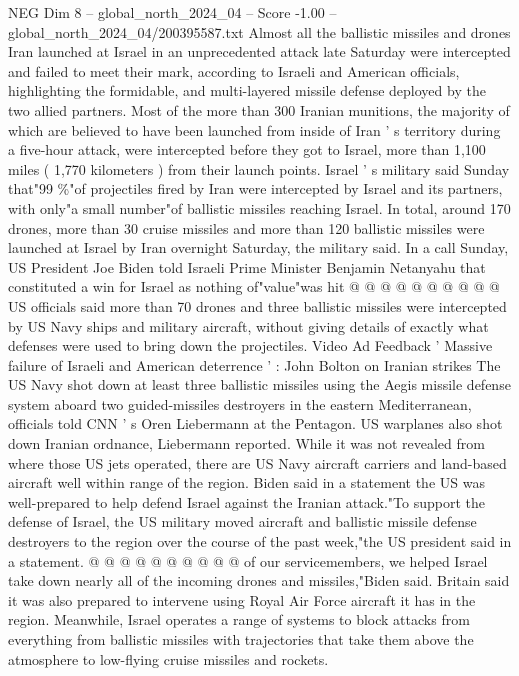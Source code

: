\begin{textsample}{NEG Dim 8 – global\_north\_2024\_04 – Score -1.00 – global\_north\_2024\_04/200395587.txt}  \label{ex:f8_neg_137}
Almost all the ballistic missiles and drones Iran launched at Israel in an unprecedented attack late Saturday were intercepted and failed to meet their mark, according to Israeli and American officials, highlighting the formidable, and multi-layered missile defense deployed by the two allied partners.
Most of the more than 300 Iranian munitions, the majority of which are believed to have been launched from inside of Iran ' s territory during a five-hour attack, were intercepted before they got to Israel, more than 1,100 miles ( 1,770 kilometers ) from their launch points.
Israel ' s military said Sunday that"99 \%"of projectiles fired by Iran were intercepted by Israel and its partners, with only"a small number"of ballistic missiles reaching Israel.
In total, around 170 drones, more than 30 cruise missiles and more than 120 ballistic missiles were launched at Israel by Iran overnight Saturday, the military said.
In a call Sunday, US President Joe Biden told Israeli Prime Minister Benjamin Netanyahu that constituted a win for Israel as nothing of"value"was hit @ @ @ @ @ @ @ @ @ @ US officials said more than 70 drones and three ballistic missiles were intercepted by US Navy ships and military aircraft, without giving details of exactly what defenses were used to bring down the projectiles.
Video Ad Feedback ' Massive failure of Israeli and American deterrence ' : John Bolton on Iranian strikes The US Navy shot down at least three ballistic missiles using the Aegis missile defense system aboard two guided-missiles destroyers in the eastern Mediterranean, officials told CNN ' s Oren Liebermann at the Pentagon.
US warplanes also shot down Iranian ordnance, Liebermann reported.
While it was not revealed from where those US jets operated, there are US Navy aircraft carriers and land-based aircraft well within range of the region.
Biden said in a statement the US was well-prepared to help defend Israel against the Iranian attack."To support the defense of Israel, the US military moved aircraft and ballistic missile defense destroyers to the region over the course of the past week,"the US president said in a statement. @ @ @ @ @ @ @ @ @ @ of our servicemembers, we helped Israel take down nearly all of the incoming drones and missiles,"Biden said.
Britain said it was also prepared to intervene using Royal Air Force aircraft it has in the region.
Meanwhile, Israel operates a range of systems to block attacks from everything from ballistic missiles with trajectories that take them above the atmosphere to low-flying cruise missiles and rockets.

\end{textsample}
